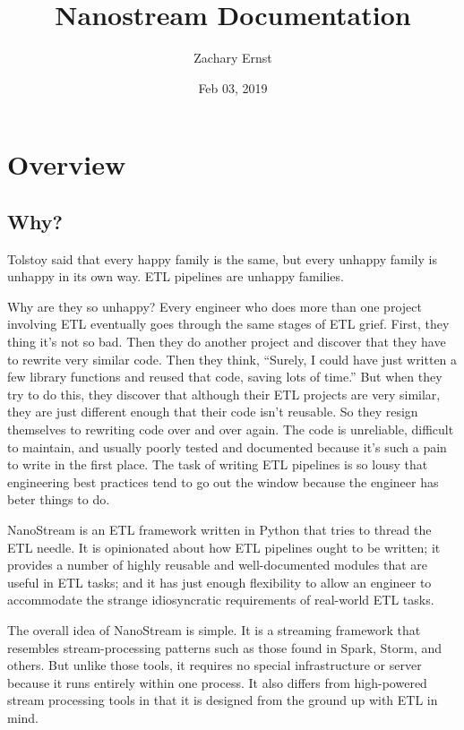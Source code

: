 \documentclass[letterpaper,10pt,english]{sphinxmanual}
\title{Nanostream Documentation}
\date{Feb 03, 2019}
\author{Zachary Ernst}
\begin{document}
\pagestyle{empty}
\maketitle
\pagestyle{plain}
\sphinxtableofcontents
\pagestyle{normal}
\label{\detokenize{index::doc}}



\chapter{Overview}
\label{\detokenize{overview:overview}}\label{\detokenize{overview::doc}}

\section{Why?}
\label{\detokenize{overview:why}}
Tolstoy said that every happy family is the same, but every unhappy family is
unhappy in its own way. ETL pipelines are unhappy families.

Why are they so unhappy? Every engineer who does more than one project involving
ETL eventually goes through the same stages of ETL grief. First, they thing it’s
not so bad. Then they do another project and discover that they have to rewrite
very similar code. Then they think, “Surely, I could have just written a few
library functions and reused that code, saving lots of time.” But when they try
to do this, they discover that although their ETL projects are very similar,
they are just different enough that their code isn’t reusable. So they resign
themselves to rewriting code over and over again. The code is unreliable,
difficult to maintain, and usually poorly tested and documented because it’s
such a pain to write in the first place. The task of writing ETL pipelines is
so lousy that engineering best practices tend to go out the window because
the engineer has beter things to do.

NanoStream is an ETL framework written in Python that tries to thread the ETL
needle. It is opinionated about how ETL pipelines ought to be written; it
provides a number of highly reusable and well-documented modules that are
useful in ETL tasks; and it has just enough flexibility to allow an engineer
to accommodate the strange idiosyncratic requirements of real-world ETL tasks.

The overall idea of NanoStream is simple. It is a streaming framework that
resembles stream-processing patterns such as those found in Spark, Storm, and
others. But unlike those tools, it requires no special infrastructure or
server because it runs entirely within one process. It also differs from
high-powered stream processing tools in that it is designed from the ground
up with ETL in mind.
\end{document}
